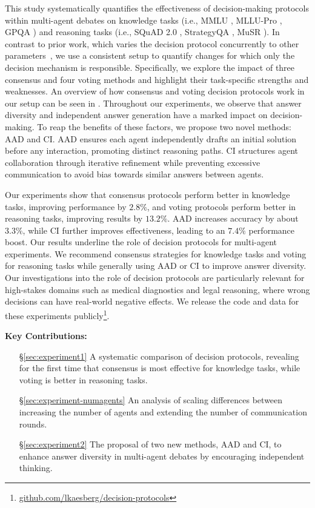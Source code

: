This study systematically quantifies the effectiveness of decision-making protocols within multi-agent debates on knowledge tasks (i.e., MMLU \citep{hendrycks_measuring_2021-1}, MLLU-Pro \citep{wang_mmlu-pro_2024}, GPQA \citep{rein_gpqa_2023}) and reasoning tasks (i.e., SQuAD 2.0 \citep{rajpurkar_know_2018}, StrategyQA \citep{geva_did_2021}, MuSR \citep{sprague_musr_2024}). 
In contrast to prior work, which varies the decision protocol concurrently to other parameters~\citep{yang_llm_2024, yin_exchange--thought_2023}, we use a consistent setup to quantify changes for which only the decision mechanism is responsible.
Specifically, we explore the impact of three consensus \citep{chen_reconcile_2024} and four voting \citep{yang_llm_2024} methods and highlight their task-specific strengths and weaknesses.
An overview of how consensus and voting decision protocols work in our setup can be seen in .
Throughout our experiments, we observe that answer diversity and independent answer generation have a marked impact on decision-making. 
To reap the benefits of these factors, we propose two novel methods: \acf{AAD} and \acf{CI}.
\ac{AAD} ensures each agent independently drafts an initial solution before any interaction, promoting distinct reasoning paths. %
\ac{CI} structures agent collaboration through iterative refinement while preventing excessive communication to avoid bias towards similar answers between agents.

Our experiments show that consensus protocols perform better in knowledge tasks, improving performance by $2.8\%$, and voting protocols perform better in reasoning tasks, improving results by $13.2\%$. 
\ac{AAD} increases accuracy by about $3.3\%$, while \ac{CI} further improves effectiveness, leading to an $7.4\%$ performance boost. 
Our results underline the role of decision protocols for multi-agent experiments. 
We recommend consensus strategies for knowledge tasks and voting for reasoning tasks while generally using \ac{AAD} or \ac{CI} to improve answer diversity. 
Our investigations into the role of decision protocols are particularly relevant for high-stakes domains such as medical diagnostics and legal reasoning, where wrong decisions can have real-world negative effects. 
We release the code and data for these experiments publicly\footnote{\href{https://github.com/lkaesberg/decision-protocols}{github.com/lkaesberg/decision-protocols}}. 

\medskip
\noindent\textbf{Key Contributions:}
\begin{itemize}
    \item[§\ref{sec:experiment1}] A systematic comparison of decision protocols, revealing for the first time that consensus is most effective for knowledge tasks, while voting is better in reasoning tasks.
    \item[§\ref{sec:experiment-numagents}] An analysis of scaling differences between increasing the number of agents and extending the number of communication rounds.
    \item[§\ref{sec:experiment2}] The proposal of two new methods, \ac{AAD} and \ac{CI}, to enhance answer diversity in multi-agent debates by encouraging independent thinking.
\end{itemize}
